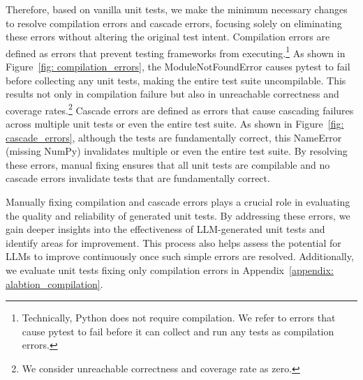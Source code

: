 

Therefore, based on vanilla unit tests, we make the minimum necessary changes to resolve compilation errors and cascade errors, focusing solely on eliminating these errors without altering the original test intent. 
Compilation errors are defined as errors that prevent testing frameworks from executing.\footnote{Technically, Python does not require compilation. We refer to errors that cause pytest to fail before it can collect and run any tests as compilation errors.} 
As shown in Figure~\ref{fig: compilation_errors}, the ModuleNotFoundError causes pytest to fail before collecting any unit tests, making the entire test suite uncompilable. This results not only in compilation failure but also in unreachable correctness and coverage rates.\footnote{We consider unreachable correctness and coverage rate as zero.}
Cascade errors are defined as errors that cause cascading failures across multiple unit tests or even the entire test suite. 
As shown in Figure~\ref{fig: cascade_errors}, although the tests are fundamentally correct, this NameError (missing NumPy) invalidates multiple or even the entire test suite.
By resolving these errors, manual fixing ensures that all unit tests are compilable and no cascade errors invalidate tests that are fundamentally correct.

Manually fixing compilation and cascade errors plays a crucial role in evaluating the quality and reliability of generated unit tests. By addressing these errors, we gain deeper insights into the effectiveness of LLM-generated unit tests and identify areas for improvement. This process also helps assess the potential for LLMs to improve continuously once such simple errors are resolved. Additionally, we evaluate unit tests fixing only compilation errors in Appendix~\ref{appendix: alabtion_compilation}.



